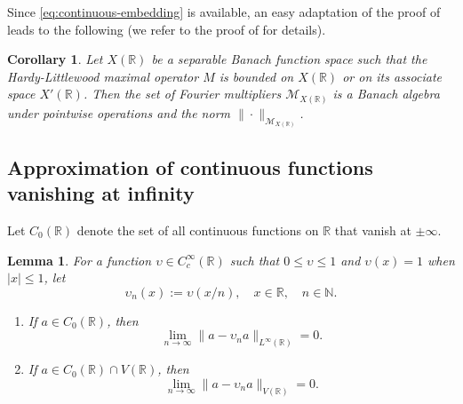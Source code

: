 \documentclass[reqno]{amsproc}
\newcommand{\cM}{\mathcal{M}}
\newcommand{\R}{\mathbb{R}}
\newtheorem{lemma}[theorem]{Lemma}
\newtheorem{corollary}[theorem]{Corollary}
\theoremstyle{definition}
\theoremstyle{remark}
\numberwithin{equation}{section}
\begin{document}
Since \eqref{eq:continuous-embedding} is available, an easy adaptation of
the proof of \cite[Proposition 2.5.13]{G14} leads to the following
(we refer to the proof of \cite[Corollary~1]{K15b} for details).
\begin{corollary}
Let $X(\R)$ be a separable Banach function space such that the
Hardy-Littlewood maximal operator $M$ is bounded on $X(\R)$ or
on its associate space $X'(\R)$. Then the set of Fourier multipliers
$\cM_{X(\R)}$ is a Banach algebra under pointwise operations and the norm
$\|\cdot\|_{\cM_{X(\R)}}$.
\end{corollary}
\subsection{Approximation of continuous functions vanishing at infinity}
Let $C_0(\R)$ denote the set of all continuous functions on $\R$ that vanish 
at $\pm\infty$. 
\begin{lemma}\label{le:approximating-vanishing}
For a function $\upsilon \in C_c^\infty(\mathbb{R})$ such that 
$0 \le \upsilon \le 1$ and $\upsilon(x) = 1$ when $|x| \le 1$, let 
\[
\upsilon_n(x) := \upsilon(x/n), \quad x\in\R, \quad n \in \mathbb{N}.
\]
\begin{enumerate}
\item[(a)] If $a\in C_0(\R)$, then
\begin{equation}\label{eq:approximating-vanishing-1}
\lim_{n\to\infty}\|a-\upsilon_n a\|_{L^\infty(\R)}=0.
\end{equation}

\item[(b)] If $a\in C_0(\R)\cap V(\R)$, then
\begin{equation}\label{eq:approximating-vanishing-2}
\lim_{n\to\infty}\|a-\upsilon_n a\|_{V(\R)}=0.
\end{equation}
\end{enumerate}
\end{lemma}
\end{document}
